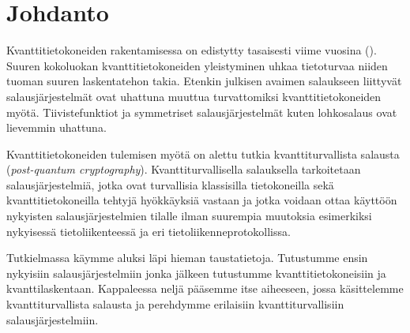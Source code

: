 \chapter{Johdanto\label{intro}}
Kvanttitietokoneiden rakentamisessa on edistytty tasaisesti viime vuosina (\cite{alagic2020status}). Suuren kokoluokan kvanttitietokoneiden yleistyminen uhkaa tietoturvaa niiden tuoman suuren laskentatehon takia. Etenkin julkisen avaimen salaukseen liittyvät salausjärjestelmät ovat uhattuna muuttua turvattomiksi kvanttitietokoneiden myötä. Tiivistefunktiot ja symmetriset salausjärjestelmät kuten lohkosalaus ovat lievemmin uhattuna.

Kvanttitietokoneiden tulemisen myötä on alettu tutkia kvanttiturvallista salausta (\emph{post-quantum cryptography}). Kvanttiturvallisella salauksella tarkoitetaan salausjärjestelmiä, jotka ovat turvallisia klassisilla tietokoneilla sekä kvanttitietokoneilla tehtyjä hyökkäyksiä vastaan ja jotka voidaan ottaa käyttöön nykyisten salausjärjestelmien tilalle ilman suurempia muutoksia esimerkiksi nykyisessä tietoliikenteessä ja eri tietoliikenneprotokollissa.

Tutkielmassa käymme aluksi läpi hieman taustatietoja. Tutustumme ensin nykyisiin salausjärjestelmiin jonka jälkeen tutustumme kvanttitietokoneisiin ja kvanttilaskentaan. Kappaleessa neljä pääsemme itse aiheeseen, jossa käsittelemme kvanttiturvallista salausta ja perehdymme erilaisiin kvanttiturvallisiin salausjärjestelmiin.